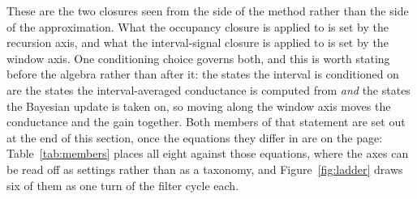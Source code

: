 
These are the two closures seen from the side of the method rather than the side of the
approximation. What the occupancy closure is applied to is set by the recursion axis, and
what the interval-signal closure is applied to is set by the window axis. One conditioning
choice governs both, and this is worth stating before the algebra rather than after it: the
states the interval is conditioned on are the states the interval-averaged conductance is
computed from \emph{and} the states the Bayesian update is taken on, so moving along the
window axis moves the conductance and the gain together. Both members of that statement are
set out at the end of this section, once the equations they differ in are on the page:
Table~\ref{tab:members} places all eight against those equations, where the axes can be read
off as settings rather than as a taxonomy, and Figure~\ref{fig:ladder} draws six of them as
one turn of the filter cycle each.

